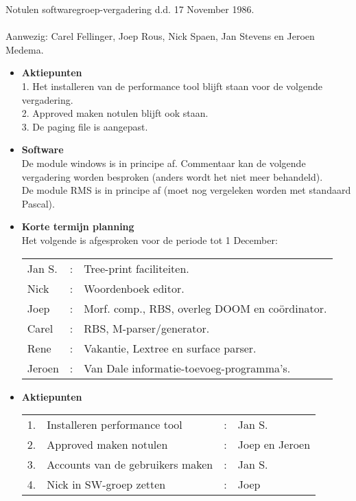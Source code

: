 {
 Notulen softwaregroep-vergadering d.d. 17 November 1986. \\ \\ 
 Aanwezig: Carel Fellinger, Joep Rous, Nick Spaen, Jan Stevens en Jeroen 
 Medema.\\ 
 \begin{itemize}
  \item {\bf Aktiepunten}\\
   1. Het installeren van de performance tool blijft staan voor de volgende 
   vergadering.\\
   2. Approved maken notulen blijft ook staan.\\
   3. De paging file is aangepast.
  \item {\bf Software}\\
   De module windows is in principe af. Commentaar kan de volgende vergadering 
   worden besproken (anders wordt het niet meer behandeld).\\
   De module RMS is in principe af (moet nog vergeleken worden met standaard
   Pascal).
  \item {\bf Korte termijn planning}\\ 
   Het volgende is afgesproken voor de periode tot 1 December:\\
   \begin{tabular}{lcl}
    Jan S. &:&Tree-print faciliteiten.                           \\
    Nick   &:&Woordenboek editor.                                \\
    Joep   &:&Morf. comp., RBS, overleg DOOM en co\"{o}rdinator. \\
    Carel  &:&RBS, M-parser/generator.                           \\
    Rene   &:&Vakantie, Lextree en surface parser.               \\
    Jeroen &:&Van Dale informatie-toevoeg-programma's.           \\
   \end{tabular}
  \item {\bf Aktiepunten}\\
   \begin{tabular}{llcl}
    1.&Installeren performance tool    &:&Jan S.\\
    2.&Approved maken notulen          &:&Joep en Jeroen\\
    3.&Accounts van de gebruikers maken&:&Jan S.\\
    4.&Nick in SW-groep zetten         &:&Joep\\
   \end{tabular}
 \end{itemize}
}
